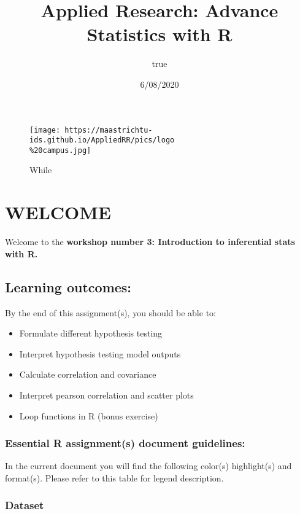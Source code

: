 \documentclass[
]{article}
\title{Applied Research: Advance Statistics with R}
\author{true}
\date{6/08/2020}
\begin{document}
\maketitle

\begin{figure}
\centering
\texttt{[image: https://maastrichtu-ids.github.io/AppliedRR/pics/logo\\\%20campus.jpg]}
\caption{While}
\end{figure}

\hypertarget{welcome}{%
\section{WELCOME}\label{welcome}}

Welcome to the \textbf{workshop number 3: Introduction to inferential
stats with R.}

\hypertarget{learning-outcomes}{%
\subsection{Learning outcomes:}\label{learning-outcomes}}

By the end of this assignment(s), you should be able to:

\begin{itemize}
\item
  Formulate different hypothesis testing
\item
  Interpret hypothesis testing model outputs
\item
  Calculate correlation and covariance
\item
  Interpret pearson correlation and scatter plots
\item
  Loop functions in R (bonus exercise)
\end{itemize}

\hypertarget{essential-r-assignments-document-guidelines}{%
\subsubsection{Essential R assignment(s) document
guidelines:}\label{essential-r-assignments-document-guidelines}}

In the current document you will find the following color(s)
highlight(s) and format(s). Please refer to this table for legend
description.

\hypertarget{dataset}{%
\subsubsection{Dataset}\label{dataset}}
\end{document}
